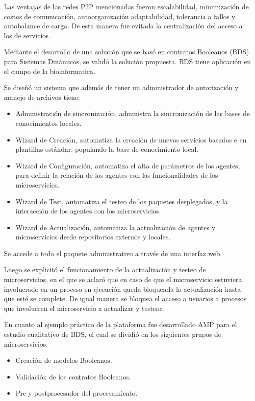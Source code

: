 Las ventajas de las redes P2P mencionadas fueron escalabilidad, minimización de costos de comunicación, 
autoorganización adaptabilidad, tolerancia a fallos y autobalance de carga. 
De esta manera fue evitada la centralización del acceso a los de servicios.


Mediante el desarrollo de una solución que se basó en contratos Booleanos (BDS) para Sistemas Dinámicos, 
se validó la solución propuesta. 
BDS tiene aplicación en el campo de la bioinformatica.

Se diseñó un sistema que además de tener un administrador de autorización y manejo de archivos tiene:

\begin{itemize}
    \item Administración de sincronización, administra la sincronización de las bases de conocimientos locales.
    \item Wizard de Creación, automatiza la creación de nuevos servicios basados e en plantillas estándar,
     populando la base de conocimiento local.
    \item Wizard de Configuración, automatiza el alta de parámetros de los agentes, 
    para definir la relación de los agentes con las funcionalidades de los microservicios.
    \item Wizard de Test, automatiza el testeo de los paquetes desplegados, 
    y la interacción de los agentes con los microservicios.
    \item Wizard de Actualización, 
    automatiza la actualización de agentes y microservicios desde repositorios externos y locales.
\end{itemize}

Se accede a todo el paquete administrativo a través de una interfaz web.


Luego se explicitó el funcionamiento de la actualización y testeo de microservicios, 
en el que se aclaró que en caso de que el microservicio estuviera involucrado 
en un proceso en ejecución queda bloqueada la actualización hasta que esté se complete. 
De igual manera se bloquea el acceso a usuarios a procesos que involucren el microservicio a actualizar y testear. 

En cuanto al ejemplo práctico de la plataforma fue desarrollado AMP para el estudio cualitativo de BDS, 
el cual se dividió en los siguientes grupos de microservicios:

\begin{itemize}
    \item Creación de modelos Booleanos.
    \item Validación de los contratos Booleanos.
    \item Pre y postprocesador del procesamiento.
\end{itemize}

